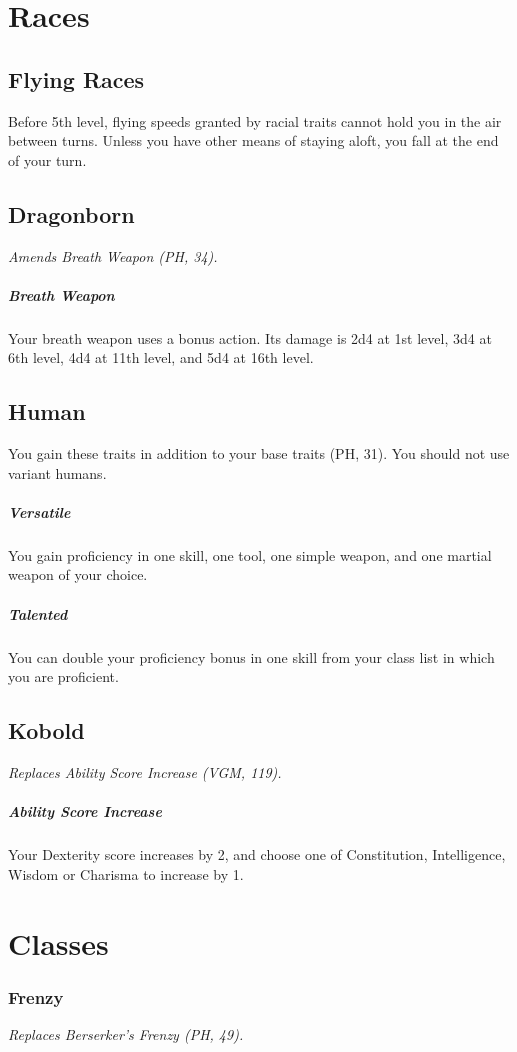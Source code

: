 \documentclass[letterpaper,twocolumn,openany,nodeprecatedcode]{dndbook}
\begin{document}
\section{Races}
\subsection{Flying Races} Before 5th level, flying speeds granted by racial traits cannot hold you in the air between turns. Unless you have other means of staying aloft, you fall at the end of your turn.

\subsection{Dragonborn}
\textit{Amends Breath Weapon (PH, 34).}

\subparagraph{Breath Weapon} Your breath weapon uses a bonus action. Its damage is 2d4 at 1st level, 3d4 at 6th level, 4d4 at 11th level, and 5d4 at 16th level.

\subsection{Human}

You gain these traits in addition to your base traits (PH, 31). You should not use variant humans.

\subparagraph{Versatile} You gain proficiency in one skill, one tool, one simple weapon, and one martial weapon of your choice.
\subparagraph{Talented} You can double your proficiency bonus in one skill from your class list in which you are proficient.

\subsection{Kobold}
\textit{Replaces Ability Score Increase (VGM, 119).}

\subparagraph{Ability Score Increase} Your Dexterity score increases by 2, and choose one of Constitution, Intelligence, Wisdom or Charisma to increase by 1.

\section{Classes}

\subsubsection{Frenzy}
\textit{Replaces Berserker's Frenzy (PH, 49).}
\end{document}
